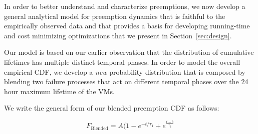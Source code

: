 In order to better understand and characterize preemptions, we now develop a general analytical model for preemption dynamics that is faithful to the empirically observed data and that provides a basis for developing running-time and cost minimizing optimizations that we present in Section~\ref{sec:design}.


Our model is based on our earlier observation that the distribution of cumulative lifetimes has multiple distinct temporal phases.
In order to model the overall empirical CDF, we develop a \emph{new} probability distribution that is composed by blending two failure processes that act on different temporal phases over the 24 hour maximum lifetime of the VMs. 

We write the general form of our blended preemption CDF as follows:

\begin{equation}
  \label{eq:blend1}
  F_{\text{Blended}} = A(1-e^{-t/\tau_1} + e^{\frac{t-b}{\tau_2}}
\end{equation}

